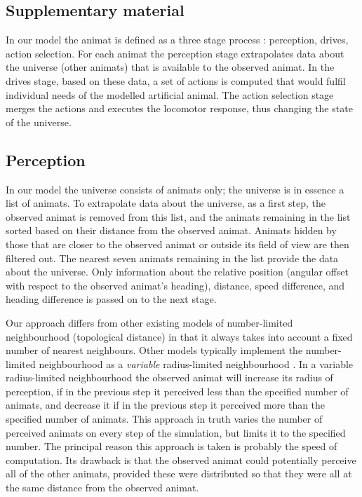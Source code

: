 \begin{subappendices}

\section{Supplementary material}

In our model the animat is defined as a three stage process \cite{lebarbajec2005fuzzy}: perception, drives, action selection. For each animat the perception stage extrapolates data about the universe (other animats) that is available to the observed animat. In the drives stage, based on these data, a set of actions is computed that would fulfil individual needs of the modelled artificial animal. The action selection stage merges the actions and executes the locomotor response, thus changing the state of the universe.

\subsection{Perception}

In our model the universe consists of animats only; the universe is in essence a list of animats. To extrapolate data about the universe, as a first step, the observed animat is removed from this list, and the animats remaining in the list sorted based on their distance from the observed animat. Animats hidden by those that are closer to the observed animat or outside its field of view are then filtered out. The nearest seven animats remaining in the list provide the data about the universe. Only information about the relative position (\ie angular offset with respect to the observed animat's heading), distance, speed difference, and heading difference is passed on to the next stage.

Our approach differs from other existing models of number-limited neighbourhood (topological distance) \cite{ballerini2008interaction} in that it always takes into account a fixed number of nearest neighbours. Other models typically implement the number-limited neighbourhood as a \emph{variable} radius-limited neighbourhood \cite{hemelrijk2011somecauses}. In a variable radius-limited neighbourhood the observed animat will increase its radius of perception, if in the previous step it perceived less than the specified number of animats, and decrease it if in the previous step it perceived more than the specified number of animats. This approach in truth varies the number of perceived animats on every step of the simulation, but limits it to the specified number. The principal reason this approach is taken is probably the speed of computation. Its drawback is that the observed animat could potentially perceive all of the other animats, provided these were distributed so that they were all at the same distance from the observed animat.


\end{subappendices}
